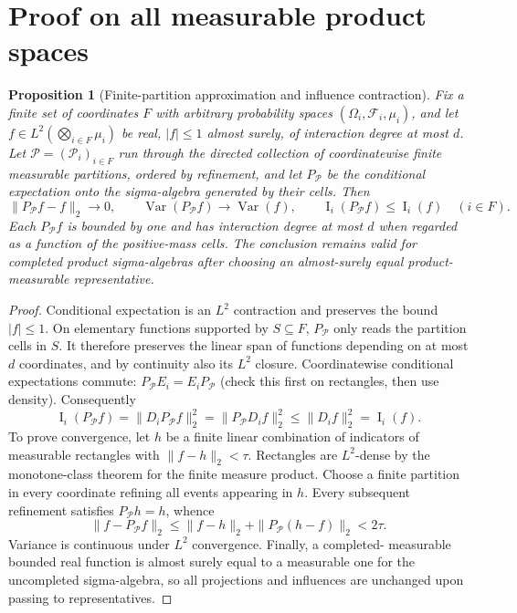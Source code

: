 \documentclass[11pt]{article}
\numberwithin{equation}{section}
\newtheorem{proposition}[theorem]{Proposition}
\theoremstyle{remark}
\newcommand{\Inf}{\operatorname{I}}
\begin{document}
\section{Proof on all measurable product spaces}\label{sec:measurable}
\begin{proposition}[Finite-partition approximation and influence contraction]\label{prop:approx}
Fix a finite set of coordinates $F$ with arbitrary probability spaces
$(\Omega_i,\mathcal F_i,\mu_i)$, and let $f\in L^2(\bigotimes_{i\in F}\mu_i)$
be real, $|f|\le1$ almost surely, of interaction degree at most $d$.
Let $\mathcal P=(\mathcal P_i)_{i\in F}$ run through the directed
collection of coordinatewise finite measurable partitions, ordered by
refinement, and let $P_{\mathcal P}$ be the conditional expectation onto
the sigma-algebra generated by their cells. Then
\begin{equation}\label{eq:approx}
 \|P_{\mathcal P}f-f\|_2\longrightarrow0,\qquad
 \operatorname{Var}(P_{\mathcal P}f)\longrightarrow\operatorname{Var}(f),
 \qquad \Inf_i(P_{\mathcal P}f)\le\Inf_i(f)\quad(i\in F).
\end{equation}
Each $P_{\mathcal P}f$ is bounded by one and has interaction degree
at most $d$ when regarded as a function of the positive-mass cells.
The conclusion remains valid for completed product sigma-algebras after
choosing an almost-surely equal product-measurable representative.
\end{proposition}
\begin{proof}
Conditional expectation is an $L^2$ contraction and preserves the bound
$|f|\le1$. On elementary functions supported by $S\subseteq F$, $P_{\mathcal
P}$ only reads the partition cells in $S$. It therefore preserves the linear
span of functions depending on at most $d$ coordinates, and by continuity
also its $L^2$ closure. Coordinatewise conditional expectations commute:
$P_{\mathcal P}E_i=E_iP_{\mathcal P}$ (check this first on rectangles,
then use density). Consequently
\[
 \Inf_i(P_{\mathcal P}f)=\|D_iP_{\mathcal P}f\|_2^2
 =\|P_{\mathcal P}D_if\|_2^2\le\|D_if\|_2^2=\Inf_i(f).
\]
To prove convergence, let $h$ be a finite linear combination of indicators
of measurable rectangles with $\|f-h\|_2<\tau$. Rectangles are $L^2$-dense
by the monotone-class theorem for the finite measure product. Choose a
finite partition in every coordinate refining all events appearing in $h$.
Every subsequent refinement satisfies $P_{\mathcal P}h=h$, whence
\[
 \|f-P_{\mathcal P}f\|_2\le
 \|f-h\|_2+\|P_{\mathcal P}(h-f)\|_2<2\tau.
\]
Variance is continuous under $L^2$ convergence. Finally, a completed-
measurable bounded real function is almost surely equal to a measurable
one for the uncompleted sigma-algebra, so all projections and influences
are unchanged upon passing to representatives.
\end{proof}
\end{document}
